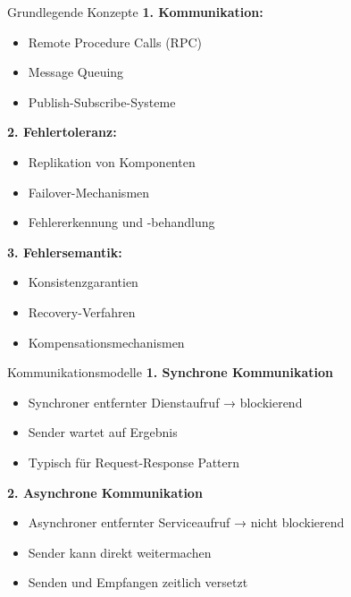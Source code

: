 \begin{concept}{Grundlegende Konzepte}
\textbf{1. Kommunikation:}
\begin{itemize}
    \item Remote Procedure Calls (RPC)
    \item Message Queuing
    \item Publish-Subscribe-Systeme
\end{itemize}

\textbf{2. Fehlertoleranz:}
\begin{itemize}
    \item Replikation von Komponenten
    \item Failover-Mechanismen
    \item Fehlererkennung und -behandlung
\end{itemize}

\textbf{3. Fehlersemantik:}
\begin{itemize}
    \item Konsistenzgarantien
    \item Recovery-Verfahren
    \item Kompensationsmechanismen
\end{itemize}
\end{concept}

\begin{definition}{Kommunikationsmodelle}
\textbf{1. Synchrone Kommunikation}
\begin{itemize}
    \item Synchroner entfernter Dienstaufruf → blockierend
    \item Sender wartet auf Ergebnis
    \item Typisch für Request-Response Pattern
\end{itemize}

\textbf{2. Asynchrone Kommunikation}
\begin{itemize}
    \item Asynchroner entfernter Serviceaufruf → nicht blockierend
    \item Sender kann direkt weitermachen
    \item Senden und Empfangen zeitlich versetzt
\end{itemize}
\end{definition}


